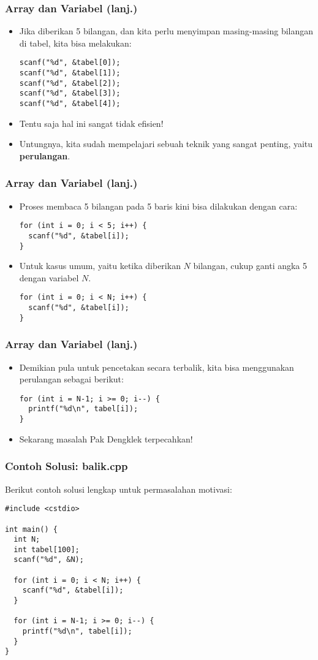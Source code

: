 \begin{frame}[fragile]
\frametitle{Array dan Variabel (lanj.)}
\begin{itemize}
  \item Jika diberikan 5 bilangan, dan kita perlu menyimpan masing-masing bilangan di tabel, kita bisa melakukan:
\begin{lstlisting}
scanf("%d", &tabel[0]);
scanf("%d", &tabel[1]);
scanf("%d", &tabel[2]);
scanf("%d", &tabel[3]);
scanf("%d", &tabel[4]);
\end{lstlisting}
  \item Tentu saja hal ini sangat tidak efisien!
  \item Untungnya, kita sudah mempelajari sebuah teknik yang sangat penting, yaitu \textbf{perulangan}.
\end{itemize}
\end{frame}

\begin{frame}[fragile]
\frametitle{Array dan Variabel (lanj.)}
\begin{itemize}
  \item Proses membaca 5 bilangan pada 5 baris kini bisa dilakukan dengan cara:
\begin{lstlisting}
for (int i = 0; i < 5; i++) {
  scanf("%d", &tabel[i]);
}
\end{lstlisting}
  \item Untuk kasus umum, yaitu ketika diberikan $N$ bilangan, cukup ganti angka 5 dengan variabel $N$.
\begin{lstlisting}
for (int i = 0; i < N; i++) {
  scanf("%d", &tabel[i]);
}
\end{lstlisting}
\end{itemize}
\end{frame}

\begin{frame}[fragile]
\frametitle{Array dan Variabel (lanj.)}
\begin{itemize}
  \item Demikian pula untuk pencetakan secara terbalik, kita bisa menggunakan perulangan sebagai berikut:
\begin{lstlisting}
for (int i = N-1; i >= 0; i--) {
  printf("%d\n", tabel[i]);
}
\end{lstlisting}
  \item Sekarang masalah Pak Dengklek terpecahkan!
\end{itemize}
\end{frame}

\begin{frame}[fragile]
\frametitle{Contoh Solusi: balik.cpp}
Berikut contoh solusi lengkap untuk permasalahan motivasi:
\begin{lstlisting}
#include <cstdio>

int main() {
  int N;
  int tabel[100];
  scanf("%d", &N);

  for (int i = 0; i < N; i++) {
    scanf("%d", &tabel[i]);
  }

  for (int i = N-1; i >= 0; i--) {
    printf("%d\n", tabel[i]);
  }
}
\end{lstlisting}
\end{frame}


